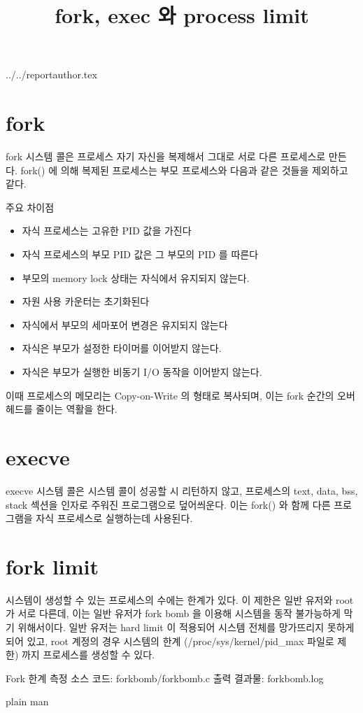 \documentclass {article}
\begin{document}
\title {fork, exec 와 process limit}
 {../../reportauthor.tex}
\maketitle

\section {fork}
fork 시스템 콜은 프로세스 자기 자신을 복제해서 그대로 서로 다른 프로세스로 만든다. fork() 에 의해 복제된 프로세스는 부모 프로세스와 다음과 같은 것들을 제외하고 같다.

주요 차이점\cite {fork}
\begin {itemize}
  \item 자식 프로세스는 고유한 PID 값을 가진다
  \item 자식 프로세스의 부모 PID 값은 그 부모의 PID 를 따른다
  \item 부모의 memory lock 상태는 자식에서 유지되지 않는다.
  \item 자원 사용 카운터는 초기화된다
  \item 자식에서 부모의 세마포어 변경은 유지되지 않는다
  \item 자식은 부모가 설정한 타이머를 이어받지 않는다.
  \item 자식은 부모가 실행한 비동기 I/O 동작을 이어받지 않는다.
\end {itemize}

이때 프로세스의 메모리는 Copy-on-Write 의 형태로 복사되며, 이는 fork 순간의 오버헤드를 줄이는 역활을 한다.

\section {execve}
execve 시스템 콜은 시스템 콜이 성공할 시 리턴하지 않고, 프로세스의 text, data, bss, stack 섹션을 인자로 주워진 프로그램으로 덮어씌운다.\cite{execve} 이는 fork() 와 함께 다른 프로그램을 자식 프로세스로 실행하는데 사용된다.


\section {fork limit}
시스템이 생성할 수 있는 프로세스의 수에는 한계가 있다. 이 제한은 일반 유저와 root 가 서로 다른데, 이는 일반 유저가 fork bomb 을 이용해 시스템을 동작 불가능하게 막기 위해서이다.
일반 유저는 hard limit 이 적용되어 시스템 전체를 망가뜨리지 못하게 되어 있고, root 계정의 경우 시스템의 한계 (/proc/sys/kernel/pid\_max 파일로 제한) 까지 프로세스를 생성할 수 있다.

Fork 한계 측정 소스 코드:
{forkbomb/forkbomb.c}
출력 결과물:
{forkbomb.log}

 {plain}
 {man}
\end{document}
